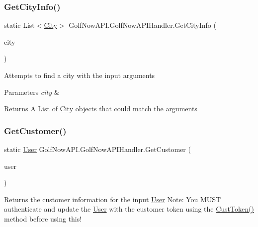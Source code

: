 \subsubsection{\texorpdfstring{GetCityInfo()}{GetCityInfo()}}
{\footnotesize\ttfamily static List$<$\mbox{\hyperlink{class_golf_now_a_p_i_1_1_city}{City}}$>$ Golf\+Now\+A\+P\+I.\+Golf\+Now\+A\+P\+I\+Handler.\+Get\+City\+Info (\begin{DoxyParamCaption}\item[{\mbox{\hyperlink{class_golf_now_a_p_i_1_1_tees_by_city_args}{Tees\+By\+City\+Args}}}]{city }\end{DoxyParamCaption})\hspace{0.3cm}{\ttfamily [static]}}



Attempts to find a city with the input arguments 


\begin{DoxyParams}{Parameters}
{\em city} & \\
\hline
\end{DoxyParams}
\begin{DoxyReturn}{Returns}
A List of \mbox{\hyperlink{class_golf_now_a_p_i_1_1_city}{City}} objects that could match the arguments
\end{DoxyReturn}
\mbox{\label{class_golf_now_a_p_i_1_1_golf_now_a_p_i_handler_a95bf35bea50911d71bdd8e10362a8e1a}} 
\subsubsection{\texorpdfstring{GetCustomer()}{GetCustomer()}}
{\footnotesize\ttfamily static \mbox{\hyperlink{class_golf_now_a_p_i_1_1_user}{User}} Golf\+Now\+A\+P\+I.\+Golf\+Now\+A\+P\+I\+Handler.\+Get\+Customer (\begin{DoxyParamCaption}\item[{\mbox{\hyperlink{class_golf_now_a_p_i_1_1_user}{User}}}]{user }\end{DoxyParamCaption})\hspace{0.3cm}{\ttfamily [static]}}



Returns the customer information for the input \mbox{\hyperlink{class_golf_now_a_p_i_1_1_user}{User}} Note\+: You M\+U\+ST authenticate and update the \mbox{\hyperlink{class_golf_now_a_p_i_1_1_user}{User}} with the customer token using the \mbox{\hyperlink{class_golf_now_a_p_i_1_1_golf_now_a_p_i_handler_ae2f95c14f042ab3008642f30b0b93e36}{Cust\+Token()}} method before using this! 



